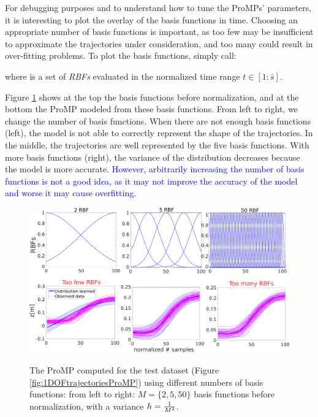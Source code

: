 \documentclass[utf8]{frontiersSCNS} %
\newcommand{\rev}[1]{\textcolor{blue}{#1}}
\newcommand{\todo}[1]{\textcolor{red}{\textbf{/*#1*/}}}
\begin{document}
For debugging purposes and to understand how to tune the ProMPs' parameters, it is interesting to plot the overlay of the basis functions in time. Choosing an appropriate number of basis functions is important, as too few may be insufficient to approximate the trajectories under consideration, and too many could result in over-fitting problems.
To plot the basis functions, simply call: 


where  is a set of \textit{RBFs} evaluated in the normalized time range $t \in [1:\bar{s}]$.

Figure \ref{fig:1DOFtrajectoriesProMPbasis} shows at the top the basis functions before normalization, and at the bottom the ProMP modeled from these basis functions. From left to right, we change the number of basis functions. When there are not enough basis functions (left), the model is not able to correctly represent the shape of the trajectories. In the middle, the trajectories are well represented by the five basis functions. With more basis functions (right), the variance of the distribution decreases because the model is more accurate. 
\rev{However, arbitrarily increasing the number of basis functions is not a good idea, as it may not improve the accuracy of the model and worse it may cause overfitting. }

\begin{figure}[h]
\centering
{
\includegraphics[width=\hsize]{img/1DOFtrajectoriesProMPbasisV4.pdf}
}
\caption{The ProMP computed for the test dataset (Figure \ref{fig:1DOFtrajectoriesProMP}) using different numbers of basis functions: from left to right: $M=\{2,5,50\}$ basis functions before normalization, with a variance $h={1 \over M^2}$. }
\label{fig:1DOFtrajectoriesProMPbasis}
\end{figure}
\end{document}
